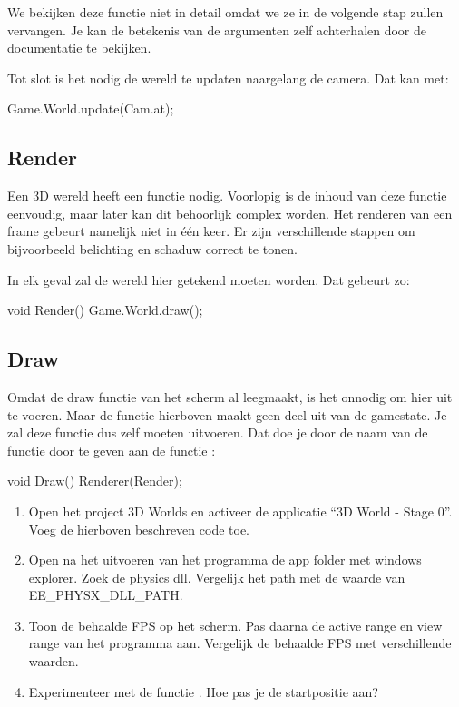 We bekijken deze functie niet in detail omdat we ze in de volgende stap zullen vervangen. Je kan de betekenis van de argumenten zelf achterhalen door de documentatie te bekijken.

Tot slot is het nodig de wereld te updaten naargelang de camera. Dat kan met:

\begin{code}
Game.World.update(Cam.at);
\end{code}

\subsection{Render}
Een 3D wereld heeft een  functie nodig. Voorlopig is de inhoud van deze functie eenvoudig, maar later kan dit behoorlijk complex worden. Het renderen van een frame gebeurt namelijk niet in \'e\'en keer. Er zijn verschillende stappen om bijvoorbeeld belichting en schaduw correct te tonen.

In elk geval zal de wereld hier getekend moeten worden. Dat gebeurt zo:

\begin{code}
void Render() {
   Game.World.draw();
}
\end{code}

\subsection{Draw}
Omdat de draw functie van  het scherm al leegmaakt, is het onnodig om hier  uit te voeren. Maar de  functie hierboven maakt geen deel uit van de gamestate. Je zal deze functie dus zelf moeten uitvoeren. Dat doe je door de naam van de functie door te geven aan de functie :

\begin{code}
void Draw() {
   Renderer(Render);
}
\end{code}

\begin{exercise}
\begin{enumerate}
	\item Open het project 3D Worlds en activeer de applicatie ``3D World - Stage 0''. Voeg de hierboven beschreven code toe.
	\item Open na het uitvoeren van het programma de app folder met windows explorer. Zoek de physics dll. Vergelijk het path met de waarde van EE\_PHYSX\_DLL\_PATH.
	\item Toon de behaalde FPS op het scherm. Pas daarna de active range en view range van het programma aan. Vergelijk de behaalde FPS met verschillende waarden.
	\item Experimenteer met de functie . Hoe pas je de startpositie aan?
\end{enumerate}
\end{exercise}

